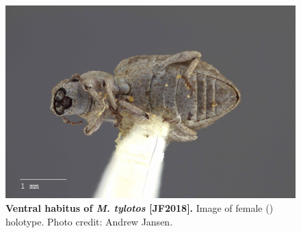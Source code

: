 \documentclass[fleqn,10pt,lineno]{wlpeerj} %
\begin{document}
\begin{figure}[h]
	\begin{sideways}
		\centering
		\includegraphics[height=\textwidth]{figure32.jpg}
	\end{sideways}
	\caption{\textbf{Ventral habitus of \textit{M. tylotos} [JF2018].} Image of female (\female) holotype. Photo credit: Andrew Jansen.}
	\label{fig:tylotos_F_ventral}
\end{figure}
\end{document}
